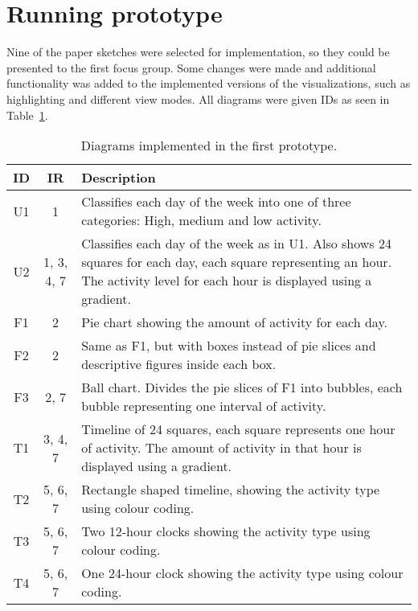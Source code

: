 \section{Running prototype}
\label{sec:runningPrototype1}
Nine of the paper sketches were selected for implementation, so they could be presented to the first focus group. Some changes were made and additional functionality was added to the implemented versions of the visualizations, such as highlighting and different view modes. All diagrams were given IDs as seen in Table~\ref{tab:runProtDesc1}.

\begin{table}[h!]
  \begin{center}
  \begin{tabular}{|c|c|p{10cm}|}
    \hline
    \textbf{ID} & \textbf{IR} & \textbf{Description}\\ \hline
    U1 & 1 & Classifies each day of the week into one of three categories: High, medium and low activity. \\ \hline
    U2 & 1, 3, 4, 7 & Classifies each day of the week as in U1. Also shows 24 squares for each day, each square representing an hour. The activity level for each hour is displayed using a gradient. \\ \hline
    F1 & 2 & Pie chart showing the amount of activity for each day. \\ \hline
    F2 & 2 & Same as F1, but with boxes instead of pie slices and descriptive figures inside each box.  \\ \hline
    F3 & 2, 7 & Ball chart. Divides the pie slices of F1 into bubbles, each bubble representing one interval of activity. \\ \hline
    T1 & 3, 4, 7 & Timeline of 24 squares, each square represents one hour of activity. The amount of activity in that hour is displayed using a gradient. \\ \hline
    T2 & 5, 6, 7 & Rectangle shaped timeline, showing the activity type using colour coding.  \\ \hline
    T3 & 5, 6, 7 & Two 12-hour clocks showing the activity type using colour coding. \\ \hline
    T4 & 5, 6, 7 & One 24-hour clock showing the activity type using colour coding. \\ \hline
  \end{tabular}
  \end{center}
  \caption{Diagrams implemented in the first prototype.}
  \label{tab:runProtDesc1}
\end{table}

